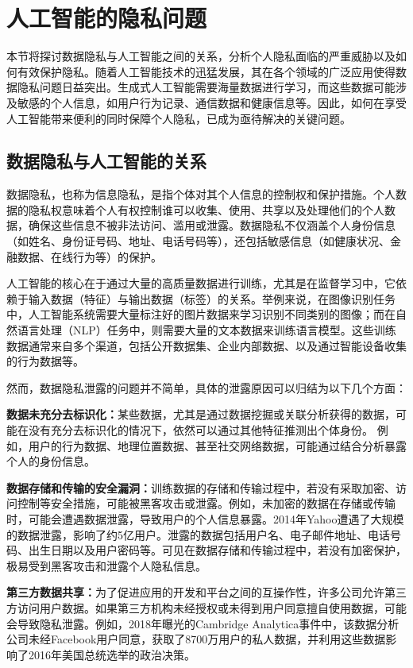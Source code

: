 \section{人工智能的隐私问题}

本节将探讨数据隐私与人工智能之间的关系，分析个人隐私面临的严重威胁以及如何有效保护隐私。随着人工智能技术的迅猛发展，其在各个领域的广泛应用使得数据隐私问题日益突出。生成式人工智能需要海量数据进行学习，而这些数据可能涉及敏感的个人信息，如用户行为记录、通信数据和健康信息等。因此，如何在享受人工智能带来便利的同时保障个人隐私，已成为亟待解决的关键问题。

\subsection{数据隐私与人工智能的关系}
数据隐私，也称为信息隐私，是指个体对其个人信息的控制权和保护措施。个人数据的隐私权意味着个人有权控制谁可以收集、使用、共享以及处理他们的个人数据，确保这些信息不被非法访问、滥用或泄露。数据隐私不仅涵盖个人身份信息（如姓名、身份证号码、地址、电话号码等），还包括敏感信息（如健康状况、金融数据、在线行为等）的保护。

人工智能的核心在于通过大量的高质量数据进行训练，尤其是在监督学习中，它依赖于输入数据（特征）与输出数据（标签）的关系。举例来说，在图像识别任务中，人工智能系统需要大量标注好的图片数据来学习识别不同类别的图像；而在自然语言处理（NLP）任务中，则需要大量的文本数据来训练语言模型。这些训练数据通常来自多个渠道，包括公开数据集、企业内部数据、以及通过智能设备收集的行为数据等。

然而，数据隐私泄露的问题并不简单，具体的泄露原因可以归结为以下几个方面：

\textbf{数据未充分去标识化：}某些数据，尤其是通过数据挖掘或关联分析获得的数据，可能在没有充分去标识化的情况下，依然可以通过其他特征推测出个体身份。
例如，用户的行为数据、地理位置数据、甚至社交网络数据，可能通过结合分析暴露个人的身份信息。

\textbf{数据存储和传输的安全漏洞：}训练数据的存储和传输过程中，若没有采取加密、访问控制等安全措施，可能被黑客攻击或泄露。例如，未加密的数据在存储或传输时，可能会遭遇数据泄露，导致用户的个人信息暴露。2014年Yahoo遭遇了大规模的数据泄露，影响了约5亿用户。泄露的数据包括用户名、电子邮件地址、电话号码、出生日期以及用户密码等。可见在数据存储和传输过程中，若没有加密保护，极易受到黑客攻击和泄露个人隐私信息。

\textbf{第三方数据共享：}为了促进应用的开发和平台之间的互操作性，许多公司允许第三方访问用户数据。如果第三方机构未经授权或未得到用户同意擅自使用数据，可能会导致隐私泄露。例如，2018年曝光的Cambridge Analytica事件中，该数据分析公司未经Facebook用户同意，获取了8700万用户的私人数据，并利用这些数据影响了2016年美国总统选举的政治决策。

